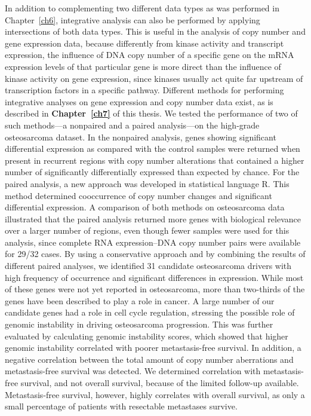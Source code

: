 In addition to complementing two different data types as was performed in Chapter~\ref{ch6}, integrative analysis can also be performed by applying intersections of both data types. This is useful in the analysis of copy number and gene expression data, because differently from kinase activity and transcript expression, the influence of DNA copy number of a specific gene on the mRNA expression levels of that particular gene is more direct than the influence of kinase activity on gene expression, since kinases usually act quite far upstream of transcription factors in a specific pathway. Different methods for performing integrative analyses on gene expression and copy number data exist, as is described in {\bf Chapter~\ref{ch7}} of this thesis. We tested the performance of two of such methods---a nonpaired and a paired analysis---on the high\hyp{}grade osteosarcoma dataset. In the nonpaired analysis, genes showing significant differential expression as compared with the control samples were returned when present in recurrent regions with copy number alterations that contained a higher number of significantly differentially expressed than expected by chance. For the paired analysis, a new approach was developed in statistical language R. This method determined cooccurrence of copy number changes and significant differential expression. A comparison of both methods on osteosarcoma data illustrated that the paired analysis returned more genes with biological relevance over a larger number of regions, even though fewer samples were used for this analysis, since complete RNA expression--DNA copy number pairs were available for 29/32 cases. By using a conservative approach and by combining the results of different paired analyses, we identified 31 candidate osteosarcoma drivers with high frequency of occurrence and significant differences in expression. While most of these genes were not yet reported in osteosarcoma, more than two\hyp{}thirds of the genes have been described to play a role in cancer. A large number of our candidate genes had a role in cell cycle regulation, stressing the possible role of genomic instability in driving osteosarcoma progression. This was further evaluated by calculating genomic instability scores, which showed that higher genomic instability correlated with poorer metastasis\hyp{}free survival. In addition, a negative correlation between the total amount of copy number aberrations and metastasis\hyp{}free survival was detected. We determined correlation with metastasis\hyp{}free survival, and not overall survival, because of the limited follow\hyp{}up available. Metastasis\hyp{}free survival, however, highly correlates with overall survival, as only a small percentage of patients with resectable metastases survive.

